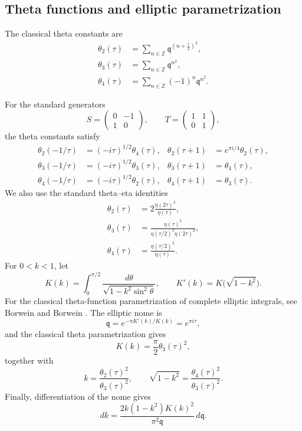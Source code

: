 \documentclass[preprint,12pt]{elsarticle}
\theoremstyle{definition}
\theoremstyle{remark}
\newcommand{\ZZ}{\mathbb{Z}}
\begin{document}
	\subsection{Theta functions and elliptic parametrization}
The classical theta constants are
	\begin{align*}
		\theta_2(\tau)&=\sum_{n\in\ZZ}\mathfrak q^{(n+\frac{1}{2})^2},\\
		\theta_3(\tau)&=\sum_{n\in\ZZ}\mathfrak q^{n^2},\\
		\theta_4(\tau)&=\sum_{n\in\ZZ}(-1)^n\mathfrak q^{n^2}.
	\end{align*}
	
For the standard generators
	\[
	S=\begin{pmatrix}0&-1\\1&0\end{pmatrix},
	\qquad
	T=\begin{pmatrix}1&1\\0&1\end{pmatrix},
	\]
the theta constants satisfy
	\begin{align*}
		\theta_2(-1/\tau)&=(-i\tau)^{1/2}\theta_4(\tau),
		&
		\theta_2(\tau+1)&=e^{\pi i/4}\theta_2(\tau),\\
		\theta_3(-1/\tau)&=(-i\tau)^{1/2}\theta_3(\tau),
		&
		\theta_3(\tau+1)&=\theta_4(\tau),\\
		\theta_4(-1/\tau)&=(-i\tau)^{1/2}\theta_2(\tau),
		&
		\theta_4(\tau+1)&=\theta_3(\tau).
	\end{align*}
We also use the standard theta--eta identities
	\begin{align*}
		\theta_2(\tau)&=2\frac{\eta(2\tau)^2}{\eta(\tau)},\\
		\theta_3(\tau)&=\frac{\eta(\tau)^5}
		{\eta(\tau/2)^2\eta(2\tau)^2},\\
		\theta_4(\tau)&=\frac{\eta(\tau/2)^2}{\eta(\tau)}.
	\end{align*}
For $0<k<1$, let
	\[
	K(k)=\int_0^{\pi/2}
	\frac{d\theta}{\sqrt{1-k^2\sin^2\theta}},
	\qquad
	K'(k)=K\bigl(\sqrt{1-k^2}\bigr).
	\]
For the classical theta-function parametrization of complete elliptic integrals, see Borwein and Borwein \cite{MR1641658}. The elliptic nome is
	\[
	\mathfrak q=e^{-\pi K'(k)/K(k)}=e^{\pi i\tau},
	\]
	and the classical theta parametrization gives
	\[
	K(k)=\frac{\pi}{2}\theta_3(\tau)^2,
	\]
	together with
	\[
	k=\frac{\theta_2(\tau)^2}{\theta_3(\tau)^2},
	\qquad
	\sqrt{1-k^2}=\frac{\theta_4(\tau)^2}{\theta_3(\tau)^2}.
	\]
Finally, differentiation of the nome gives
\[
	dk=\frac{2k(1-k^2)K(k)^2}
	{\pi^2\mathfrak q}\,d\mathfrak q.
\]
	
\end{document}
